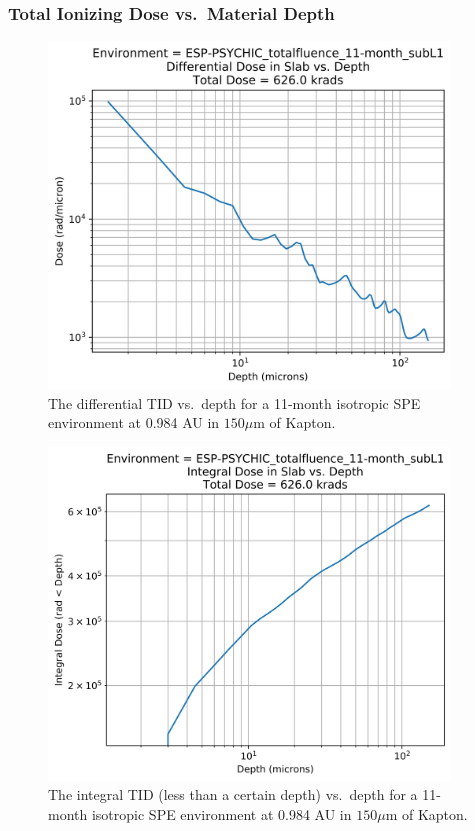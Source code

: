 \documentclass{hitec}
\begin{document}
\newpage
\subsubsection{Total Ionizing Dose vs.\ Material Depth}
\label{sssec:TID-SPE-Dose vs Depth}

\begin{figure}[htbp!]
	\centering
	\includegraphics[width=0.95\textwidth]{../ESP-PSYCHIC_totalfluence_11-month_subL1_Differential_Dose_vs_Depth.png}
	\caption{The differential TID vs.\ depth for a 11-month isotropic SPE environment at 0.984 AU in $150 \mu$m of Kapton.}\label{fig:ESP-PSYCHIC_totalfluence_11-month_subL1_Differential_Dose_vs_Depth}
\end{figure}

\begin{figure}[htbp!]
	\centering
	\includegraphics[width=0.95\textwidth]{../ESP-PSYCHIC_totalfluence_11-month_subL1_Integral_Dose_vs_Depth.png}
	\caption{The integral TID (less than a certain depth) vs.\ depth for a 11-month isotropic SPE environment at 0.984 AU in $150 \mu$m of Kapton.}\label{fig:ESP-PSYCHIC_totalfluence_11-month_subL1_Integral_Dose_vs_Depth}
\end{figure}
\end{document}
